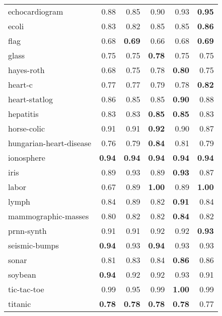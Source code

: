 \documentclass[a4paper,twoside,12pt]{book}
\begin{document}
\begin{table}[!htb]
\begin{tabular}{lrrrrr}
echocardiogram          &  0.88 &     0.85 &      0.90 &   0.93 &  \textbf{0.95} \\
ecoli                   &  0.83 &     0.82 &      0.85 &   0.85 &  \textbf{0.86} \\
flag                    &  0.68 &    \textbf{ 0.69} &      0.66 &   0.68 &  \textbf{0.69} \\
glass                   &  0.75 &     0.75 &      \textbf{0.78} &   0.75 &  0.75 \\
hayes-roth              &  0.68 &     0.75 &      0.78 &   \textbf{0.80} &  0.75 \\
heart-c                 &  0.77 &     0.77 &      0.79 &   0.78 &  \textbf{0.82} \\
heart-statlog           &  0.86 &     0.85 &      0.85 &  \textbf{ 0.90} &  0.88 \\
hepatitis               &  0.83 &     0.83 &      \textbf{0.85} &   \textbf{0.85} &  0.83 \\
horse-colic             &  0.91 &     0.91 &      \textbf{0.92} &   0.90 &  0.87 \\
hungarian-heart-disease &  0.76 &     0.79 &      \textbf{0.84} &   0.81 &  0.79 \\
ionosphere              &  \textbf{0.94} &     \textbf{0.94} &      \textbf{0.94} &   \textbf{0.94} &  \textbf{0.94} \\
iris                    &  0.89 &     0.93 &      0.89 &  \textbf{ 0.93} &  0.87 \\
labor                   &  0.67 &     0.89 &      \textbf{1.00} &   0.89 &  \textbf{1.00} \\
lymph                   &  0.84 &     0.89 &      0.82 &   \textbf{0.91} &  0.84 \\
mammographic-masses     &  0.80 &     0.82 &      0.82 &   \textbf{0.84} &  0.82 \\
prnn-synth              &  0.91 &     0.91 &      0.92 &   0.92 &  \textbf{0.93} \\
seismic-bumps           &  \textbf{0.94} &     0.93 &      \textbf{0.94} &   0.93 &  0.93 \\
sonar                   &  0.81 &     0.83 &      0.84 &   \textbf{0.86} &  0.86 \\
soybean                 &  \textbf{0.94} &     0.92 &      0.92 &   0.93 &  0.91 \\
tic-tac-toe             &  0.99 &     0.95 &      0.99 &   \textbf{1.00} &  0.99 \\
titanic                 &  \textbf{0.78} &     \textbf{0.78} &      \textbf{0.78} &   \textbf{0.78} &  0.77 \\

\end{tabular}
\end{table}
\end{document}
